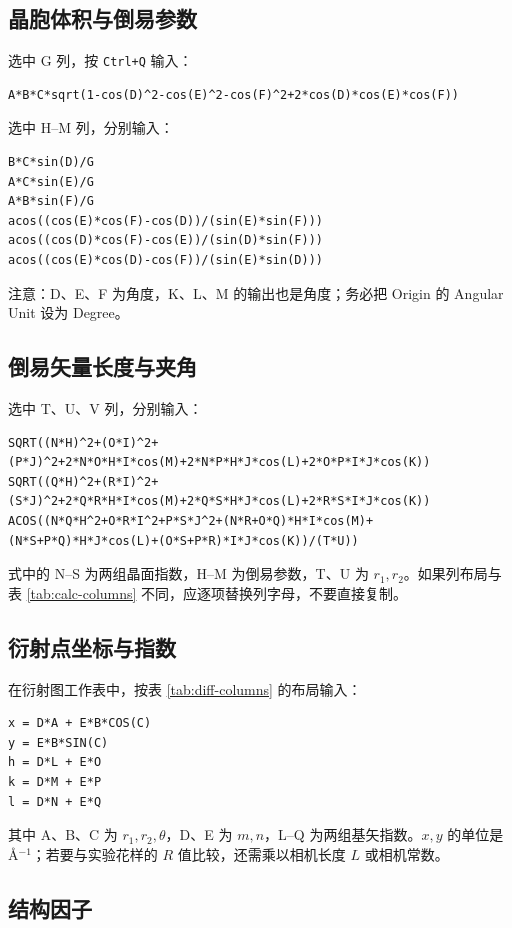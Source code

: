 \subsection{晶胞体积与倒易参数}

选中 G 列，按 \texttt{Ctrl+Q} 输入：
\begin{lstlisting}
A*B*C*sqrt(1-cos(D)^2-cos(E)^2-cos(F)^2+2*cos(D)*cos(E)*cos(F))
\end{lstlisting}
选中 H--M 列，分别输入：
\begin{lstlisting}
B*C*sin(D)/G
A*C*sin(E)/G
A*B*sin(F)/G
acos((cos(E)*cos(F)-cos(D))/(sin(E)*sin(F)))
acos((cos(D)*cos(F)-cos(E))/(sin(D)*sin(F)))
acos((cos(E)*cos(D)-cos(F))/(sin(E)*sin(D)))
\end{lstlisting}
注意：D、E、F 为角度，K、L、M 的输出也是角度；务必把 Origin 的 Angular Unit 设为 Degree。

\subsection{倒易矢量长度与夹角}

选中 T、U、V 列，分别输入：
\begin{lstlisting}
SQRT((N*H)^2+(O*I)^2+(P*J)^2+2*N*O*H*I*cos(M)+2*N*P*H*J*cos(L)+2*O*P*I*J*cos(K))
SQRT((Q*H)^2+(R*I)^2+(S*J)^2+2*Q*R*H*I*cos(M)+2*Q*S*H*J*cos(L)+2*R*S*I*J*cos(K))
ACOS((N*Q*H^2+O*R*I^2+P*S*J^2+(N*R+O*Q)*H*I*cos(M)+(N*S+P*Q)*H*J*cos(L)+(O*S+P*R)*I*J*cos(K))/(T*U))
\end{lstlisting}
式中的 N--S 为两组晶面指数，H--M 为倒易参数，T、U 为 $r_1,r_2$。如果列布局与表 \ref{tab:calc-columns} 不同，应逐项替换列字母，不要直接复制。

\subsection{衍射点坐标与指数}

在衍射图工作表中，按表 \ref{tab:diff-columns} 的布局输入：
\begin{lstlisting}
x = D*A + E*B*COS(C)
y = E*B*SIN(C)
h = D*L + E*O
k = D*M + E*P
l = D*N + E*Q
\end{lstlisting}
其中 A、B、C 为 $r_1,r_2,\theta$，D、E 为 $m,n$，L--Q 为两组基矢指数。$x,y$ 的单位是 \AA$^{-1}$；若要与实验花样的 $R$ 值比较，还需乘以相机长度 $L$ 或相机常数。

\subsection{结构因子}

